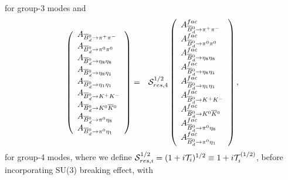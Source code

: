 \documentclass[aps,preprint,floats,epsf,epsfig,nofootinbib,letter]{revtex4}
\newcommand{\ov}{\overline}
\newcommand{\Sc}{{\cal S}}
\begin{document}
for group-3 modes and
\begin{eqnarray}
\left(
\begin{array}{l}
 A_{\ov B {}^0_{d}\to \pi^+\pi^-}\\
 A_{\ov B {}^0_{d}\to \pi^0 \pi^0}\\
 A_{\ov B {}^0_{d}\to \eta_8 \eta_8}\\
 A_{\ov B {}^0_{d}\to \eta_8 \eta_1}\\
 A_{\ov B {}^0_{d}\to \eta_1 \eta_1}\\
 A_{\ov B {}^0_{d}\to K^+ K^-}\\
 A_{\ov B {}^0_{d}\to K^0 \ov K {}^0}\\
 A_{\ov B {}^0_{d}\to \pi^0 \eta_8}\\
 A_{\ov B {}^0_{d}\to \pi^0 \eta_1}
\end{array}
\right)
 &=& \Sc_{res,4}^{1/2}
 \left(
\begin{array}{l}
 A^{fac}_{\ov B {}^0_{d}\to \pi^+\pi^-}\\
 A^{fac}_{\ov B {}^0_{d}\to \pi^0 \pi^0}\\
 A^{fac}_{\ov B {}^0_{d}\to \eta_8 \eta_8}\\
 A^{fac}_{\ov B {}^0_{d}\to \eta_8 \eta_1}\\
 A^{fac}_{\ov B {}^0_{d}\to \eta_1 \eta_1}\\
 A^{fac}_{\ov B {}^0_{d}\to K^+ K^-}\\
 A^{fac}_{\ov B {}^0_{d}\to K^0 \ov K {}^0}\\
 A^{fac}_{\ov B {}^0_{d}\to \pi^0 \eta_8}\\
 A^{fac}_{\ov B {}^0_{d}\to \pi^0 \eta_1}
\end{array}
\right),
 \label{eq:FSIB0pipi}
\end{eqnarray}
for group-4 modes,
%
where we define ${\cal S}^{1/2}_{res,i}=(1+i{\cal T}_i)^{1/2}\equiv 1+i{\cal T}_i^{(1/2)}$, before incorporating SU(3) breaking effect, with
\end{document}

